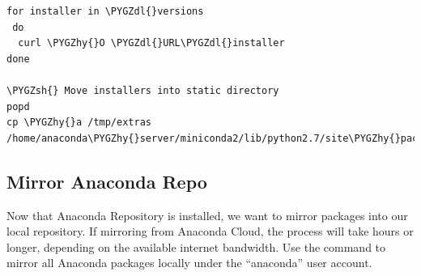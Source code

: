 \documentclass[letterpaper,10pt,openany,oneside]{sphinxmanual}
\def\PYGZsh{\char`\#}
\def\PYGZdl{\char`\$}
\def\PYGZhy{\char`\-}
\begin{document}
\begin{itemize}
\begin{Verbatim}[commandchars=\\\{\}]
for installer in \PYGZdl{}versions
 do
  curl \PYGZhy{}O \PYGZdl{}URL\PYGZdl{}installer
done

\PYGZsh{} Move installers into static directory
popd
cp \PYGZhy{}a /tmp/extras /home/anaconda\PYGZhy{}server/miniconda2/lib/python2.7/site\PYGZhy{}packages/binstar/static
\end{Verbatim}

\end{itemize}


\subsection{Mirror Anaconda Repo}
\label{AnacondaRepository:mirror-anaconda-repo}
Now that Anaconda Repository is installed, we want to mirror packages into our
local repository. If mirroring from Anaconda Cloud, the process will
take hours or longer, depending on the available internet bandwidth. Use
the  command to mirror all Anaconda
packages locally under the ``anaconda'' user account.
\end{document}
